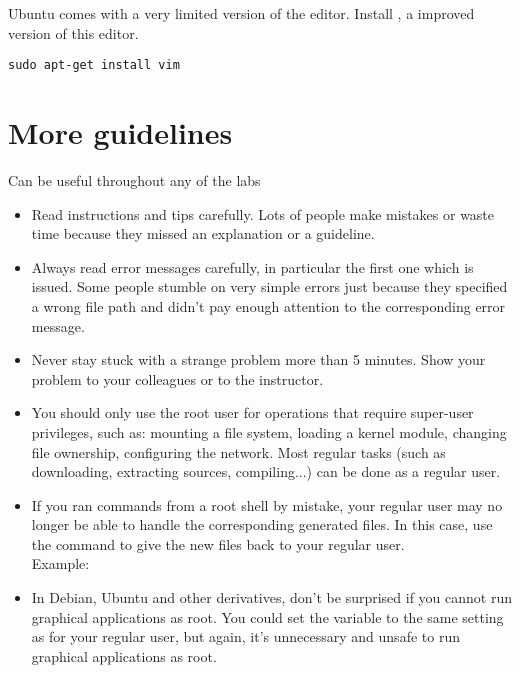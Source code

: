 Ubuntu comes with a very limited version of the 
editor. Install , a improved version of this editor.

\begin{verbatim}
sudo apt-get install vim
\end{verbatim}

\section{More guidelines}

Can be useful throughout any of the labs

\begin{itemize}

\item Read instructions and tips carefully. Lots of people make
  mistakes or waste time because they missed an explanation or a
  guideline.

\item Always read error messages carefully, in particular the first
  one which is issued. Some people stumble on very simple errors just
  because they specified a wrong file path and didn't pay enough
  attention to the corresponding error message.

\item Never stay stuck with a strange problem more than 5
  minutes. Show your problem to your colleagues or to the instructor.

\item You should only use the root user for operations that require
  super-user privileges, such as: mounting a file system, loading a
  kernel module, changing file ownership, configuring the
  network. Most regular tasks (such as downloading, extracting
  sources, compiling...) can be done as a regular user.

\item If you ran commands from a root shell by mistake, your regular
  user may no longer be able to handle the corresponding generated
  files. In this case, use the  command to give the new
  files back to your regular user.\\
  Example: 

\item In Debian, Ubuntu and other derivatives, don't be surprised if
  you cannot run graphical applications as root. You could set the
   variable to the same setting as for your regular user, but
  again, it's unnecessary and unsafe to run graphical applications as
  root.

\end{itemize}

